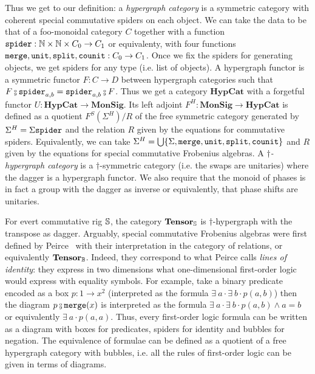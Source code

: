 Thus we get to our definition: a \emph{hypergraph category} is a symmetric category with coherent special commutative spiders on each object.
We can take the data to be that of a foo-monoidal category $C$ together with a function $\spider : \N \times \N \times C_0 \to C_1$ or equivalenty, with four functions $\merge, \unit, \ttsplit, \counit : C_0 \to C_1$.
Once we fix the spiders for generating objects, we get spiders for any type (i.e. list of objects).
A hypergraph functor is a symmetric functor $F : C \to D$ between hypergraph categories such that $F \fcmp \spider_{a, b} = \spider_{a, b} \fcmp F$.
Thus we get a category $\mathbf{HypCat}$ with a forgetful functor $U : \mathbf{HypCat} \to \mathbf{MonSig}$.
Its left adjoint $F^H : \mathbf{MonSig} \to \mathbf{HypCat}$ is defined as a quotient $F^S(\Sigma^H) / R$ of the free symmetric category generated by $\Sigma^H = \Sigma \spider$ and the relation $R$ given by the equations for commutative spiders.
Equivalently, we can take $\Sigma^H = \bigcup \{ \Sigma, \merge, \unit, \ttsplit, \counit \}$ and $R$ given by the equations for special commutative Frobenius algebras.
A \emph{$\dagger$-hypergraph category} is a $\dagger$-symmetric category (i.e. the swaps are unitaries) where the dagger is a hypergraph functor.
We also require that the monoid of phases is in fact a group with the dagger as inverse or equivalently, that phase shifts are unitaries.

\begin{example}
For evert commutative rig $\S$, the category $\mathbf{Tensor}_\S$ is $\dagger$-hypergraph with the transpose as dagger.
Arguably, special commutative Frobenius algebras were first defined by Peirce~\cite{Peirce06} with their interpretation in the category of relations, or equivalently $\mathbf{Tensor}_\B$.
Indeed, they correspond to what Peirce calls \emph{lines of identity}: they express in two dimensions what one-dimensional first-order logic would express with equality symbols.
For example, take a binary predicate encoded as a box $p : 1 \to x^2$ (interpreted as the formula $\exists \ a \cdot \exists \ b \cdot p(a, b)$) then the diagram $p \fcmp \merge(x)$ is interpreted as the formula $\exists \ a \cdot \exists \ b \cdot p(a, b) \land a = b$ or equivalently $\exists \ a \cdot p(a, a)$.
Thus, every first-order logic formula can be written as a diagram with boxes for predicates, spiders for identity and bubbles for negation.
The equivalence of formulae can be defined as a quotient of a free hypergraph category with bubbles, i.e. all the rules of first-order logic can be given in terms of diagrams.
\end{example}

